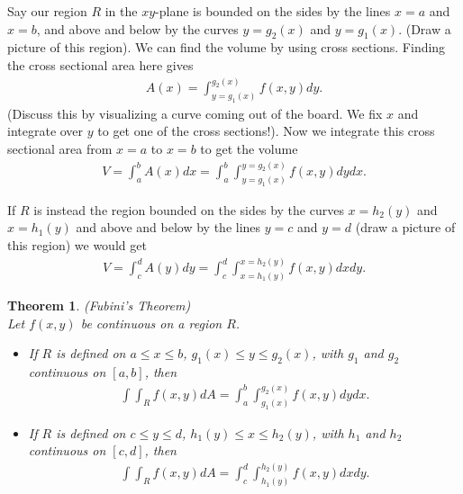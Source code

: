 \documentclass[12pt, letter]{article}
\theoremstyle{plain}
\newtheorem{theorem}{Theorem}
\numberwithin{theorem}{section}
\theoremstyle{definition}
\begin{document}
\hrulefill

\bigskip

Say our region $R$ in the $xy$-plane is bounded on the sides by the lines $x=a$ and $x=b$, and above and below by the curves $y=g_2(x)$ and $y=g_1(x)$. (Draw a picture of this region). We can find the volume by using cross sections. Finding the cross sectional area here gives
\begin{align*}
A(x) = \int_{y=g_1(x)}^{g_2(x)} f(x,y)dy.
\end{align*}
(Discuss this by visualizing a curve coming out of the board. We fix $x$ and integrate over $y$ to get one of the cross sections!). Now we integrate this cross sectional area from $x=a$ to $x=b$ to get the volume
\begin{align*}
V=\int_a^b A(x)dx = \int_a^b \int_{y=g_1(x)}^{y=g_2(x)} f(x,y)dy dx.
\end{align*}

\bigskip

If $R$ is instead the region bounded on the sides by the curves $x=h_2(y)$ and $x=h_1(y)$ and above and below by the lines $y=c$ and $y=d$ (draw a picture of this region) we would get
\begin{align*}
V=\int_c^d A(y)dy = \int_c^d \int_{x=h_1(y)}^{x=h_2(y)} f(x,y)dxdy.
\end{align*}

\bigskip

\hrulefill

\bigskip

\begin{theorem}{(Fubini's Theorem)}
\\
Let $f(x,y)$ be continuous on a region $R$.
\begin{itemize}
\item[1.] If $R$ is defined on $a\leq x\leq b$, $g_1(x)\leq y \leq g_2(x)$, with $g_1$ and $g_2$ continuous on $[a,b]$, then
\begin{align*}
\int \int_R f(x,y)dA = \int_a^b \int_{g_1(x)}^{g_2(x)} f(x,y)dydx.
\end{align*}
\item[2.]If $R$ is defined on $c\leq y\leq d$, $h_1(y)\leq x \leq h_2(y)$, with $h_1$ and $h_2$ continuous on $[c,d]$, then
\begin{align*}
\int \int_R f(x,y)dA = \int_c^d \int_{h_1(y)}^{h_2(y)} f(x,y)dxdy.
\end{align*}
\end{itemize}
\end{theorem}
\end{document}
